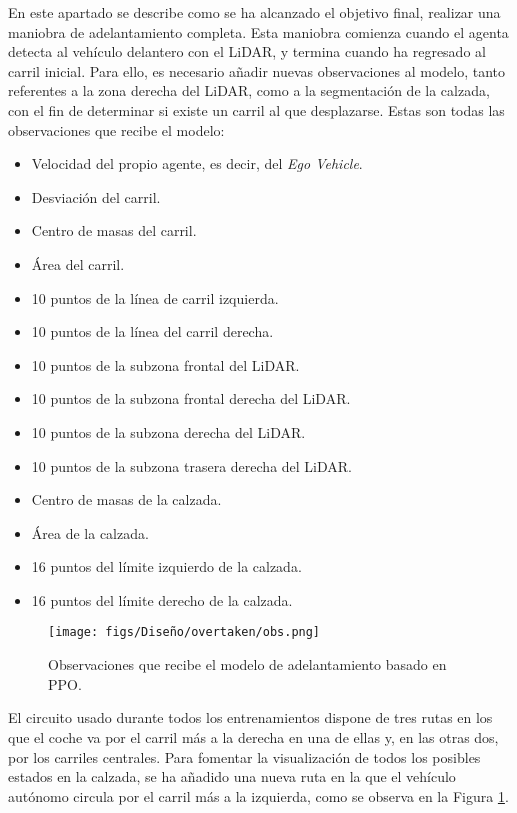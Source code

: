 En este apartado se describe como se ha alcanzado el objetivo final, realizar una maniobra de adelantamiento completa. Esta maniobra comienza cuando el agenta detecta al vehículo delantero con el \ac{LiDAR}, y termina cuando ha regresado al carril inicial. Para ello, es necesario añadir nuevas observaciones al modelo, tanto referentes a la zona derecha del \ac{LiDAR}, como a la segmentación de la calzada, con el fin de determinar si existe un carril al que desplazarse. Estas son todas las observaciones que recibe el modelo:
\begin{itemize}
\item Velocidad del propio agente, es decir, del \textit{Ego Vehicle}.
\item Desviación del carril.
\item Centro de masas del carril.
\item Área del carril.
\item 10 puntos de la línea de carril izquierda.
\item 10 puntos de la línea del carril derecha.
\item 10 puntos de la subzona frontal del \ac{LiDAR}.
\item 10 puntos de la subzona frontal derecha del \ac{LiDAR}.
\item 10 puntos de la subzona derecha del \ac{LiDAR}.
\item 10 puntos de la subzona trasera derecha del \ac{LiDAR}.
\item Centro de masas de la calzada.
\item Área de la calzada.
\item 16 puntos del límite izquierdo de la calzada.
\item 16 puntos del límite derecho de la calzada.
\end{itemize}

\begin{figure}[ht]
\centering
\texttt{[image: figs/Diseño/overtaken/obs.png]}
\caption{Observaciones que recibe el modelo de adelantamiento basado en \ac{PPO}.}
\label{fig:obs_overtaken}
\end{figure}

El circuito usado durante todos los entrenamientos dispone de tres rutas en los que el coche va por el carril más a la derecha en una de ellas y, en las otras dos, por los carriles centrales. Para fomentar la visualización de todos los posibles estados en la calzada, se ha añadido una nueva ruta en la que el vehículo autónomo circula por el carril más a la izquierda, como se observa en la Figura \ref{fig:obs_overtaken}.

